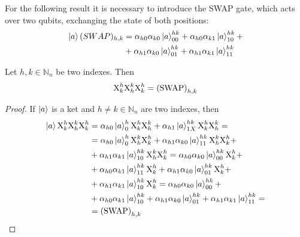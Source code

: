 \documentclass[sigconf,natbib=false]{acmart}
\begin{document}
	For the following result it is necessary to introduce the SWAP gate, which acts over two qubits, exchanging the state of both positions:
	\begin{align}
		\label{eq:swap}
		\begin{split}
			\ket{a}(SWAP)_{h,k}&=\alpha_{h0}\alpha_{k0}\ket{a}^{hk}_{00}+\alpha_{h0}\alpha_{k1}\ket{a}^{hk}_{10}+\\
			&+\alpha_{h1}\alpha_{k0}\ket{a}^{hk}_{01}+\alpha_{h1}\alpha_{k1}\ket{a}^{hk}_{11}
		\end{split}
	\end{align}
	\begin{proposition}
		Let $h,k \in \mathbb{N}_n$ be two indexes.
		Then
		\begin{equation}
			\text{X}^{h}_{k}\text{X}^{k}_{h}\text{X}^{h}_{k} = \text{(SWAP)}^{}_{h,k}
		\end{equation}
	\end{proposition}
	\begin{proof}
		If $\ket{a}$ is a ket and $h\neq k \in \mathbb{N}_n$ are two indexes, then 
		\begin{align*}
			\ket{a}\text{X}^{h}_{k}\text{X}^{k}_{h}\text{X}^{h}_{k}
			&=\alpha_{h0}\ket{a}^{h}_{0}\text{X}^{h}_{k}\text{X}^{k}_{h}+
			\alpha_{h1}\ket{a}^{hk}_{1X}\text{X}^{h}_{k}\text{X}^{k}_{h}=\\
			&=\alpha_{h0}\ket{a}^{h}_{0}\text{X}^{k}_{h}\text{X}^{h}_{k}+
			\alpha_{h1}\alpha_{k0}\ket{a}^{hk}_{11}\text{X}^{k}_{h}\text{X}^{h}_{k}+\\
			&+\alpha_{h1}\alpha_{k1}\ket{a}^{hk}_{10}\text{X}^{k}_{h}\text{X}^{h}_{k}
			=\alpha_{h0}\alpha_{k0}\ket{a}^{hk}_{00}\text{X}^{h}_{k}+\\
			&+\alpha_{h0}\alpha_{k1}\ket{a}^{hk}_{11}\text{X}^{h}_{k}
			+\alpha_{h1}\alpha_{k0}\ket{a}^{hk}_{01}\text{X}^{h}_{k}+\\
			&+\alpha_{h1}\alpha_{k1}\ket{a}^{hk}_{10}\text{X}^{h}_{k}
			=\alpha_{h0}\alpha_{k0}\ket{a}^{hk}_{00}+\\
			&+\alpha_{h0}\alpha_{k1}\ket{a}^{hk}_{10}
			+\alpha_{h1}\alpha_{k0}\ket{a}^{hk}_{01}+ \alpha_{h1}\alpha_{k1}\ket{a}^{hk}_{11}=\\
			&=\text{(SWAP)}^{}_{h,k}
		\end{align*}
	\end{proof}
\end{document}
